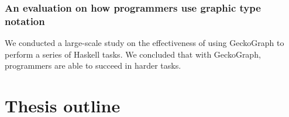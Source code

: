 \subsubsection{An evaluation on how programmers use graphic type notation}

We conducted a large-scale study on the effectiveness of using GeckoGraph to perform a series of Haskell tasks. We concluded that with GeckoGraph, programmers are able to succeed in harder tasks.










\section{Thesis outline}

